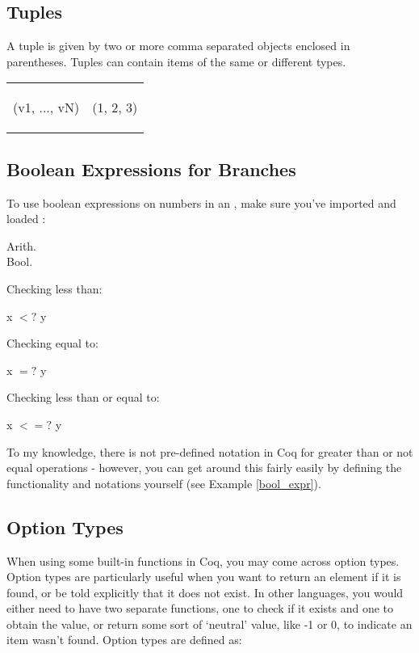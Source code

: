 \subsection{Tuples} \label{subsec: tuple} 

A tuple is given by two or more comma separated objects enclosed in parentheses. Tuples can contain items of the same or different types.

\hspace{-1cm}
\begin{tabular}{p{8cm} p{8cm}}
\begin{code}
	(v1, ..., vN)
\end{code}
&
\begin{code}
	(1, 2, 3)
\end{code}
\end{tabular}



\subsection{Boolean Expressions for Branches} \label{subsec: bool_expr} 
To use boolean expressions on numbers in an , make sure you've imported  and loaded :
\begin{code}
	 Arith.	\\
	\Load Bool.
\end{code}

Checking less than:
\begin{code}
	x $<?$ y 
\end{code}

Checking equal to:
\begin{code}
	x $=?$ y
\end{code}

Checking less than or equal to:
\begin{code}
	x $<=?$ y
\end{code}

\noindent
To my knowledge, there is not pre-defined notation in Coq for greater than or not equal operations - however, you can get around this fairly easily by defining the functionality and notations yourself  (see Example \ref{bool_expr}).






\subsection{Option Types} \label{subsec: opt_ty}
When using some built-in functions in Coq, you may come across option types. 
Option types are particularly useful when you want to return an element if it is found, or be told explicitly that it does not exist.
In other languages, you would either need to have two separate functions, one to check if it exists and one to obtain the value, or return some sort of `neutral' value, like -1 or 0, to indicate an item wasn't found.
Option types are defined as: 

